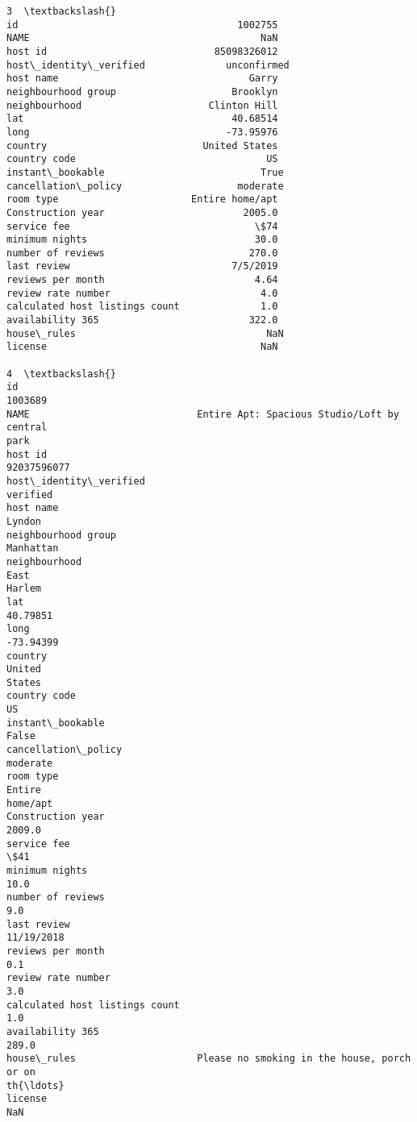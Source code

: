 \documentclass[11pt]{article}
\begin{document}
\begin{tcolorbox}[breakable, size=fbox, boxrule=.5pt, pad at break*=1mm, opacityfill=0]
\begin{Verbatim}[commandchars=\\\{\}]
                                              3  \textbackslash{}
id                                      1002755
NAME                                        NaN
host id                             85098326012
host\_identity\_verified              unconfirmed
host name                                 Garry
neighbourhood group                    Brooklyn
neighbourhood                      Clinton Hill
lat                                    40.68514
long                                  -73.95976
country                           United States
country code                                 US
instant\_bookable                           True
cancellation\_policy                    moderate
room type                       Entire home/apt
Construction year                        2005.0
service fee                                \$74
minimum nights                             30.0
number of reviews                         270.0
last review                            7/5/2019
reviews per month                          4.64
review rate number                          4.0
calculated host listings count              1.0
availability 365                          322.0
house\_rules                                 NaN
license                                     NaN

4  \textbackslash{}
id
1003689
NAME                             Entire Apt: Spacious Studio/Loft by central
park
host id
92037596077
host\_identity\_verified
verified
host name
Lyndon
neighbourhood group
Manhattan
neighbourhood                                                         East
Harlem
lat
40.79851
long
-73.94399
country                                                             United
States
country code
US
instant\_bookable
False
cancellation\_policy
moderate
room type                                                         Entire
home/apt
Construction year
2009.0
service fee                                                                  \$41
minimum nights
10.0
number of reviews
9.0
last review
11/19/2018
reviews per month
0.1
review rate number
3.0
calculated host listings count
1.0
availability 365
289.0
house\_rules                     Please no smoking in the house, porch or on
th{\ldots}
license
NaN


\end{Verbatim}
\end{tcolorbox}
\end{document}
